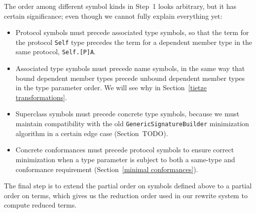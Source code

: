\documentclass[../generics]{subfiles}
\begin{document}
The order among different symbol kinds in Step~1 looks arbitrary, but it has certain significance; even though we cannot fully explain everything yet:
\begin{itemize}
\item Protocol symbols must precede associated type symbols, so that the term for the protocol \verb|Self| type precedes the term for a dependent member type in the same protocol, \verb|Self.[P]A|.
\item Associated type symbols must precede name symbols, in the same way that bound dependent member types precede unbound dependent member types in the type parameter order. We will see why in Section~\ref{tietze transformations}.
\item Superclass symbols must precede concrete type symbols, because we must maintain compatibility with the old \texttt{GenericSignatureBuilder} minimization algorithm in a certain edge case (Section~TODO).
\item Concrete conformances must precede protocol symbols to ensure correct minimization when a type parameter is subject to both a same-type and conformance requirement (Section~\ref{minimal conformances}).
\end{itemize}

%
%
%
%
The final step is to extend the partial order on symbols defined above to a partial order on terms, which gives us the reduction order used in our rewrite system to compute reduced terms.
\end{document}
